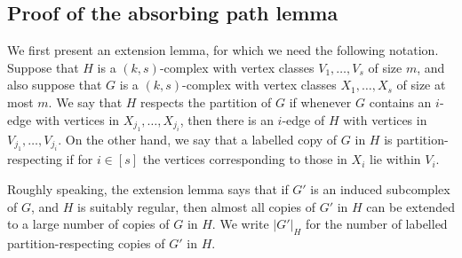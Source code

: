 \documentclass[11pt, reqno]{amsart}    	%
\newtheorem{lemma}[thm]{Lemma}
\theoremstyle{definition}
\numberwithin{equation}{section}
\begin{document}
	\begin{appendix}
		\section{Proof of the absorbing path lemma}
		We first present an extension lemma, for which we need the following notation.
		Suppose that $H$ is a $(k, s)$-complex with vertex classes $V_1,\dots,V_s$ of size $m$, and also suppose that $G$ is a $(k, s)$-complex with vertex classes $X_1,\dots, X_s$ of size at most $m$. We say that $H$ respects the partition of $G$ if whenever $G$ contains an $i$-edge with vertices in $X_{j_1}, \dots , X_{j_i}$, then there is an $i$-edge of $H$ with vertices in $V_{j_1}, \dots , V_{j_i}$. On the other hand, we say that a labelled copy of $G$ in $H$ is partition-respecting if for $i \in [s]$ the vertices corresponding to those in $X_i$ lie within $V_i$.
		
		
		Roughly speaking, the extension lemma says that if $G'$ is an induced subcomplex of $G$, and $H$ is suitably regular, then almost all copies of $G'$ in $H$ can be extended to a large number of copies of $G$ in $H$. We write $|G'|_{H}$ for the number of labelled partition-respecting copies of $G'$ in $H$.
		

\end{appendix}
\end{document}
